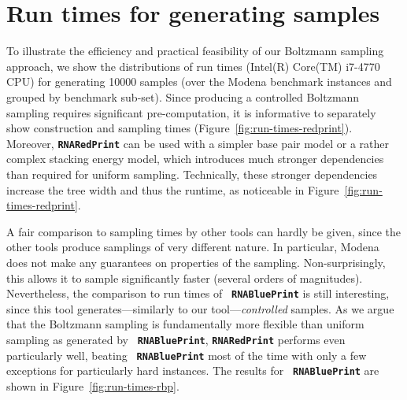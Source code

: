 \documentclass[10pt]{article}
\newcommand{\RNAblueprint}{{\tt \bfseries{}\color{black!85} RNA\textcolor{blue!70!black}{Blue}Print}}
\newcommand{\ourprog}{{\tt \bfseries{}\color{black!85}RNA\textcolor{red!70!black}{Red}Print}}
\newenvironment{revision}{\color{red}}{\color{black}}
\begin{document}
\begin{revision}

  \section{Run times for generating samples}

To illustrate the efficiency and practical feasibility of our Boltzmann sampling approach, we show the distributions of run times (Intel(R) Core(TM) i7-4770 CPU) for generating 10000 samples (over the Modena benchmark instances and grouped by benchmark sub-set). Since producing a controlled Boltzmann sampling requires significant pre-computation, it is informative to separately show construction and sampling times (Figure~\ref{fig:run-times-redprint}). Moreover, \ourprog{} can be used with a simpler base pair model or a rather complex stacking energy model, which introduces much stronger dependencies than required for uniform sampling. Technically, these stronger dependencies increase the tree width and thus the runtime, as noticeable in Figure~\ref{fig:run-times-redprint}.

A fair comparison to sampling times by other tools can hardly be given, since the other tools produce samplings of very different nature. In particular, Modena does not make any guarantees on properties of the sampling. Non-surprisingly, this allows it to sample significantly faster (several orders of magnitudes).
Nevertheless, the comparison to run times of \RNAblueprint{} is still interesting, since this tool generates---similarly to our tool---\emph{controlled} samples. As we argue that the Boltzmann sampling is fundamentally more flexible than uniform sampling as generated by \RNAblueprint, \ourprog{} performs even particularly well, beating \RNAblueprint{} most of the time with only a few exceptions for particularly hard instances. The results for \RNAblueprint{} are shown in Figure~\ref{fig:run-times-rbp}.


\end{revision}
\end{document}
